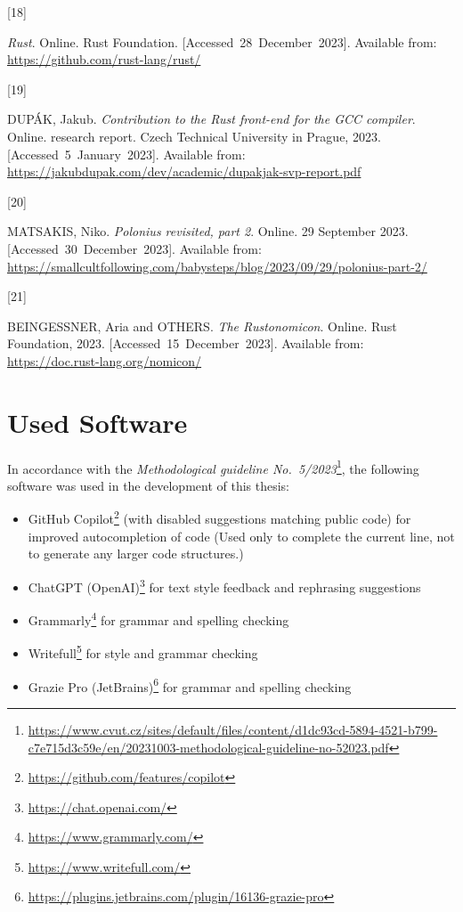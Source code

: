 \documentclass[
  11pt,
  twoside]{report}
\providecommand{\tightlist}{%
  \setlength{\itemsep}{0pt}\setlength{\parskip}{0pt}}
\newlength{\cslhangindent}
\newlength{\csllabelwidth}
\newenvironment{CSLReferences}[2] %
 {\begin{list}{}{%
  \setlength{\itemindent}{0pt}
  \setlength{\leftmargin}{0pt}
  \setlength{\parsep}{0pt}
  \ifodd #1
   \setlength{\leftmargin}{\cslhangindent}
   \setlength{\itemindent}{-1\cslhangindent}
  \fi
  \setlength{\itemsep}{#2\baselineskip}}}
 {\end{list}}
\newcommand{\CSLLeftMargin}[1]{\parbox[t]{\csllabelwidth}{\strut#1\strut}}
\newcommand{\CSLRightInline}[1]{\parbox[t]{\linewidth - \csllabelwidth}{\strut#1\strut}}
\DeclareRobustCommand{\href}[2]{#2\footnote{\url{#1}}}
\begin{document}
\begin{CSLReferences}{0}{1}
\CSLLeftMargin{{[}18{]} }%
\CSLRightInline{\emph{Rust}. Online. Rust Foundation.
{[}Accessed~28~December~2023{]}. Available from:
\url{https://github.com/rust-lang/rust/}}

\CSLLeftMargin{{[}19{]} }%
\CSLRightInline{DUPÁK, Jakub. \emph{Contribution to the {R}ust front-end
for the {GCC} compiler}. Online. research report. Czech Technical
University in Prague, 2023. {[}Accessed~5~January~2023{]}. Available
from: \url{https://jakubdupak.com/dev/academic/dupakjak-svp-report.pdf}}

\CSLLeftMargin{{[}20{]} }%
\CSLRightInline{MATSAKIS, Niko. \emph{Polonius revisited, part 2}.
Online. 29 September 2023. {[}Accessed~30~December~2023{]}. Available
from:
\url{https://smallcultfollowing.com/babysteps/blog/2023/09/29/polonius-part-2/}}

\CSLLeftMargin{{[}21{]} }%
\CSLRightInline{BEINGESSNER, Aria and OTHERS. \emph{The {R}ustonomicon}.
Online. Rust Foundation, 2023. {[}Accessed~15~December~2023{]}.
Available from: \url{https://doc.rust-lang.org/nomicon/}}

\end{CSLReferences}

\section{Used Software}\label{sec:used-software}

In accordance with the
\href{https://www.cvut.cz/sites/default/files/content/d1dc93cd-5894-4521-b799-c7e715d3c59e/en/20231003-methodological-guideline-no-52023.pdf}{\emph{Methodological
guideline No.~5/2023}}, the following software was used in the
development of this thesis:

\begin{itemize}
\tightlist
\item
  \href{https://github.com/features/copilot}{GitHub Copilot} (with
  disabled suggestions matching public code) for improved autocompletion
  of code (Used only to complete the current line, not to generate any
  larger code structures.)
\item
  \href{https://chat.openai.com/}{ChatGPT (OpenAI)} for text style
  feedback and rephrasing suggestions
\item
  \href{https://www.grammarly.com/}{Grammarly} for grammar and spelling
  checking
\item
  \href{https://www.writefull.com/}{Writefull} for style and grammar
  checking
\item
  \href{https://plugins.jetbrains.com/plugin/16136-grazie-pro}{Grazie
  Pro (JetBrains)} for grammar and spelling checking
\end{itemize}
\end{document}
